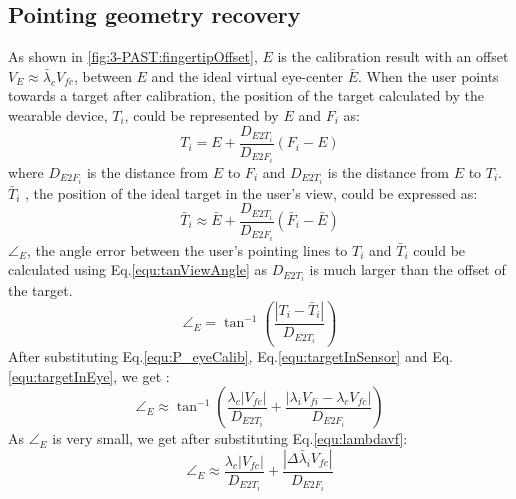 \subsection{Pointing geometry recovery} \label{sec:3-PAST:PASTrecovery}
As shown in \figurename{ \ref{fig:3-PAST:fingertipOffset}}, $E$ is the calibration result with an offset $V_{E} \approx \bar\lambda_c V_{fc}$, between $E$ and the ideal virtual eye-center ${\bar E}$. 
When the user points towards a target after calibration, the position of the target calculated by the wearable device, $T_i$, could be represented by $E$ and $F_i$ as:
\begin{equation} \label{equ:targetInSensor}
T_i = E+ \frac{D_{E2T_i}}{D_{E2F_i}}  \left( {F_i - E} \right)
\end{equation}
where $D_{E2F_i}$ is the distance from $E$ to ${{F_i}}$ and $D_{E2T_i}$ is the distance from ${E}$ to ${T_i}$. \\
$\bar T_i$ , the position of the ideal target in the user's view, could be expressed as:
\begin{equation} \label{equ:targetInEye}
\bar T_i \approx {\bar E} + \frac{D_{E2T_i}}{D_{E2F_i}}  \left( {{\bar F_i} - {\bar E}} \right)
\end{equation}
${\angle}_{E}$, the angle error between the user's pointing lines to $T_i$ and $\bar T_i$ could be calculated using Eq.\ref{equ:tanViewAngle} as $D_{E2T_i}$ is much larger than the offset of the target. 
\begin{equation} \label{equ:tanViewAngle}
{\angle}_{E} = \tan^{-1} \left( {\frac{| {T_i - \bar T_i}| }{D_{E2T_i}} } \right)
\end{equation}
After substituting Eq.\ref{equ:P_eyeCalib}, Eq.\ref{equ:targetInSensor} and Eq.\ref{equ:targetInEye}, we get :
\begin{equation} \label{equ:tanViewAngle1}
{\angle}_{E} \approx \tan^{-1} \left( {{\frac{{\lambda_c{|V_{fc}|} }}{D_{E2T_i}} + \frac{{|\lambda_i V_{fi} - \lambda_c V_{fc}|} }{D_{E2F_i}}} } \right)
\end{equation}
As ${\angle}_{E}$ is very small, we get after substituting Eq.\ref{equ:lambdavf}:
\begin{equation} \label{equ:ViewAngleError}
{\angle}_{E} \approx \frac{ {\lambda_c{|V_{fc}|}} }{D_{E2T_i}} + \frac{ {|\Delta \bar \lambda_i V_{fc}|} }{D_{E2F_i}}
\end{equation}
